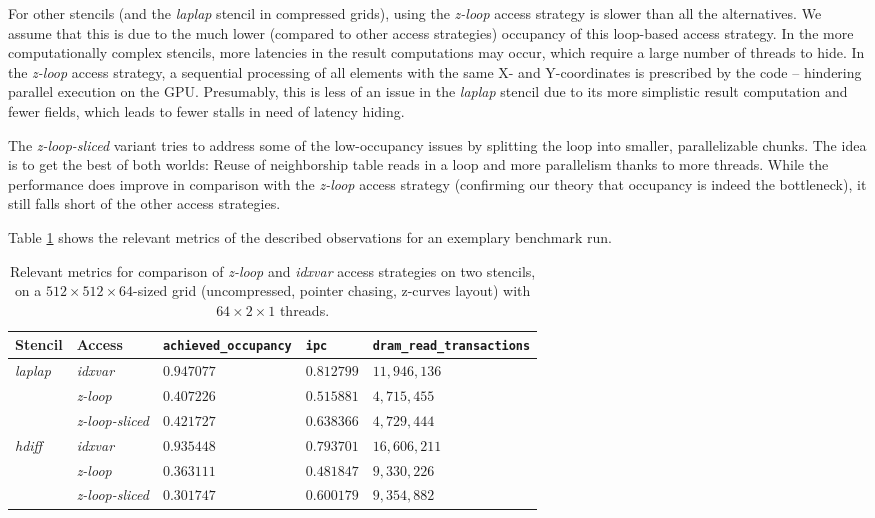 For other stencils (and the \emph{laplap} stencil in compressed grids), using the \emph{z-loop} access strategy is slower than all the alternatives.  We assume that this is due to the much lower (compared to other access strategies) occupancy of this loop-based access strategy. In the more computationally complex stencils, more latencies in the result computations may occur, which require a large number of threads to hide. In the \emph{z-loop} access strategy, a sequential processing of all elements with the same X- and Y-coordinates is prescribed by the code -- hindering parallel execution on the GPU. Presumably, this is less of an issue in the \emph{laplap} stencil due to its more simplistic result computation and fewer fields, which leads to fewer stalls in need of latency hiding.

The \emph{z-loop-sliced} variant tries to address some of the low-occupancy issues by splitting the loop into smaller, parallelizable chunks. The idea is to get the best of both worlds: Reuse of neighborship table reads in a loop and more parallelism thanks to more threads. While the performance does improve in comparison with the \emph{z-loop} access strategy (confirming our theory that occupancy is indeed the bottleneck), it still falls short of the other access strategies.

Table \ref{tab:access-z-loop} shows the relevant metrics of the described observations for an exemplary benchmark run.

\begin{table}
	\begin{tabular}{l l p{2.5cm} p{2.5cm} p{2.5cm}}
		\hline
		\textbf{Stencil} & \textbf{Access} & \textbf{\texttt{achieved\_\allowbreak occupancy}} & \textbf{\texttt{ipc}} & \textbf{\texttt{dram\_\allowbreak read\_\allowbreak transactions}} \\
		\hline
		\hline
		\emph{laplap} & \emph{idxvar} & $0.947077$ & $0.812799$ & $11,946,136$ \\
		& \emph{z-loop} & $0.407226$ & $0.515881$ & $4,715,455$ \\
		& \emph{z-loop-sliced} & $0.421727$ & $0.638366$ & $4,729,444$ \\
		\hline
		\emph{hdiff} & \emph{idxvar} & $0.935448$ & $0.793701$ & $16,606,211$ \\
		& \emph{z-loop} & $0.363111$ & $0.481847$ & $9,330,226$ \\
		& \emph{z-loop-sliced} & $0.301747$ & $0.600179$ & $9,354,882$ \\
		\hline
	\end{tabular}
	\caption{\label{tab:access-z-loop} Relevant metrics for comparison of \emph{z-loop} and \emph{idxvar} access strategies on two stencils, on a $512\times 512\times 64$-sized grid (uncompressed, pointer chasing, z-curves layout) with $64\times 2\times 1$ threads.}
\end{table}

